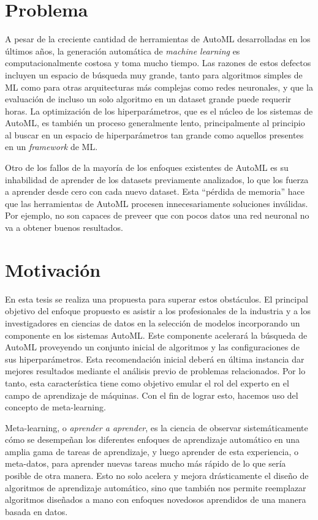 \section*{Problema}

A pesar de la creciente cantidad de herramientas de AutoML desarrolladas en los últimos años, la generación automática de \textit{machine learning} es computacionalmente costosa y toma mucho tiempo. Las razones de estos defectos incluyen un espacio de búsqueda muy grande, tanto para algoritmos simples de ML como para otras arquitecturas más complejas como redes neuronales, y que la evaluación de incluso un solo algoritmo en un dataset grande puede requerir horas. La optimización de los hiperparámetros, que es el núcleo de los sistemas de AutoML, es también un proceso generalmente lento, principalmente al principio al buscar en un espacio de hiperparámetros tan grande como aquellos presentes en un \textit{framework} de ML.

Otro de los fallos de la mayoría de los enfoques existentes de AutoML es su inhabilidad de aprender de los datasets previamente analizados, lo que los fuerza a aprender desde cero con cada nuevo dataset. Esta ``pérdida de memoria'' hace que las herramientas de AutoML procesen innecesariamente soluciones inválidas. Por ejemplo, no son capaces de preveer que con pocos datos una red neuronal no va a obtener buenos resultados. 

\section*{Motivación}

En esta tesis se realiza una propuesta para superar estos obstáculos. El principal objetivo del enfoque propuesto es asistir a los profesionales de la industria y a los investigadores en ciencias de datos en la selección de modelos incorporando un componente en los sistemas AutoML. Este componente acelerará la búsqueda de AutoML proveyendo un conjunto inicial de algoritmos y las configuraciones de sus hiperparámetros. Esta recomendación inicial deberá en última instancia dar mejores resultados mediante el análisis previo de problemas relacionados. Por lo tanto, esta característica tiene como objetivo emular el rol del experto en el campo de aprendizaje de máquinas. Con el fin de lograr esto, hacemos uso del concepto de meta-learning. 

Meta-learning, o \textit{aprender a aprender}, es la ciencia de observar sistemáticamente cómo se desempeñan los diferentes enfoques de aprendizaje automático en una amplia gama de tareas de aprendizaje, y luego aprender de esta experiencia, o meta-datos, para aprender nuevas tareas mucho más rápido de lo que sería posible de otra manera. Esto no solo acelera y mejora drásticamente el diseño de algoritmos de aprendizaje automático, sino que también nos permite reemplazar algoritmos diseñados a mano con enfoques novedosos aprendidos de una manera basada en datos.

